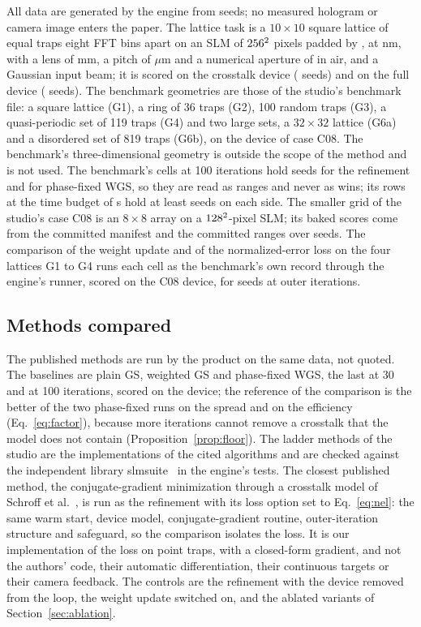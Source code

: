 All data are generated by the engine from seeds; no measured hologram or camera image enters the paper. The lattice task is a $10\times10$ square lattice of equal traps eight FFT bins apart on an SLM of $256^2$ pixels padded by \parPad, at \parLambda{} nm, with a lens of \parFocal{} mm, a pitch of \parPitch{} $\mu$m and a numerical aperture of
\parNa{} in air, and a Gaussian input beam; it is scored on the crosstalk device (\nSeedsOne{} seeds) and on the full device (\nSeedsOneFull{} seeds). The benchmark geometries are those of the studio's benchmark file: a square lattice (G1), a ring of 36 traps (G2), 100 random traps (G3), a quasi-periodic set of 119 traps (G4) and two large sets, a $32\times32$ lattice (G6a) and a disordered set of
819 traps (G6b), on the device of case C08. The benchmark's three-dimensional geometry is outside the scope of the method and is not used. The benchmark's cells at 100 iterations hold \benchOneDevSeeds{} seeds for the refinement and \benchOneDevSeedsMseven{} for phase-fixed WGS, so they are read as ranges and never as wins; its rows at the time budget of \benchOneTimeBudget{} s hold at least \benchOneWinMinSeeds{} seeds on each side. The smaller grid of the studio's case C08 is an $8\times8$ array on a $128^2$-pixel SLM; its baked scores come from
the committed manifest and the committed ranges over \bakeCeightSeedsN{} seeds. The comparison of the weight update and of the normalized-error loss on the four lattices G1 to G4 runs each cell as the benchmark's own record through the engine's runner, scored on the C08 device, for \geoSeeds{} seeds at \geoIters{} outer iterations.

\subsection{Methods compared}

The published methods are run by the product on the same data, not quoted. The baselines are plain GS, weighted GS and phase-fixed WGS, the last at 30 and at 100 iterations, scored on the device; the reference of the comparison is the better of the two phase-fixed runs on the spread and on the efficiency (Eq.~\ref{eq:factor}), because more iterations cannot remove a crosstalk that the model does not contain (Proposition~\ref{prop:floor}).
The ladder methods of the studio are the implementations of the cited algorithms and are checked against the independent library slmsuite~\cite{slmsuite} in the engine's tests. The closest published method, the conjugate-gradient minimization through a crosstalk model of Schroff et al.~\cite{schroff}, is run as the refinement with its loss option set to Eq.~\ref{eq:nel}: the same warm start, device model, conjugate-gradient routine, outer-iteration structure and safeguard, so the comparison isolates the loss. It is our implementation of the loss on point traps, with a closed-form gradient, and not the authors' code, their automatic differentiation, their continuous targets or their camera feedback. The controls are the refinement with the device removed from the loop, the weight update switched on, and the ablated variants of Section~\ref{sec:ablation}.


